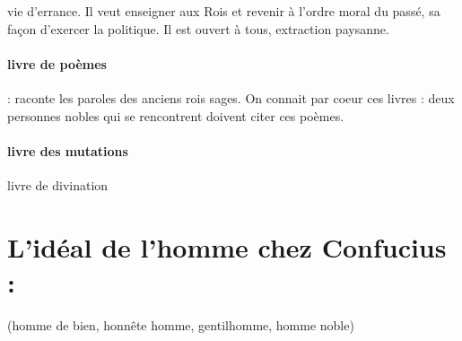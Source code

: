 \begin{Synthesis}
    vie d'errance. Il veut enseigner aux Rois et revenir à l'ordre moral du passé, sa façon d'exercer la politique. 
    Il est ouvert à tous, extraction paysanne. 
\end{Synthesis}


\paragraph{livre de poèmes } : raconte les paroles des anciens rois sages. On connait par coeur ces livres : deux personnes nobles qui se rencontrent doivent citer ces poèmes.
\paragraph{livre des mutations} livre de divination
\section{L’idéal de l’homme chez Confucius :}  
\begin{Def}[Le junzi 君子]
     (homme de bien, honnête homme, gentilhomme, homme noble)   
\end{Def}

